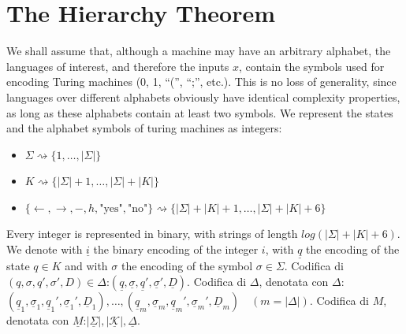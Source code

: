 \documentclass[12pt]{article}
\newcommand{\ra}{\rightarrow}
\newcommand{\la}{\leftarrow}
\begin{document}
\section{The Hierarchy Theorem}
We shall assume that, although a machine may have an arbitrary alphabet, the languages of interest, and therefore the inputs $x$, contain the symbols used for encoding Turing machines (0, 1, ``('', ``;'', etc.). This is no loss of generality, since languages over different alphabets obviously have identical complexity properties, as long as these alphabets contain at least two symbols. We represent the states and the alphabet symbols of turing machines as integers:
\begin{itemize}
\item$\Sigma\rightsquigarrow\{1,\dots,|\Sigma|\}$
\item $K\rightsquigarrow\{|\Sigma|+1,\dots,|\Sigma|+|K|\}$
\item $\{\la,\ra,-,h,\text{"yes"},\text{"no"}\}\rightsquigarrow\{|\Sigma|+|K|+1,\dots,|\Sigma|+|K|+6\}$ 
\end{itemize}
Every integer is represented in binary, with strings of length $log(|\Sigma|+|K|+6)$. We denote with $\underline i$ the binary encoding of the integer $i$, with $\underline q$ the encoding of the state $q\in K$ and with $\sigma$ the encoding of the symbol $\sigma\in\Sigma$.
Codifica di $(q, \sigma, q', \sigma', D) \in \Delta$:$(\underline q,\underline \sigma,\underline q',\underline \sigma',\underline D)$.
 Codifica di  $\Delta$, denotata con $\Delta$:$ (\underline q_1,\underline \sigma_1,\underline q_1',\underline \sigma_1',\underline D_1), \dots, (\underline q_m,\underline \sigma_m,\underline q_m',\underline \sigma_m',\underline D_m) \quad (m = |\Delta|)$. Codifica di $M$, denotata con $\underline M$:$  |\underline\Sigma|, |\mathcal{\underline K}|,\underline \Delta$.
 
\end{document}
